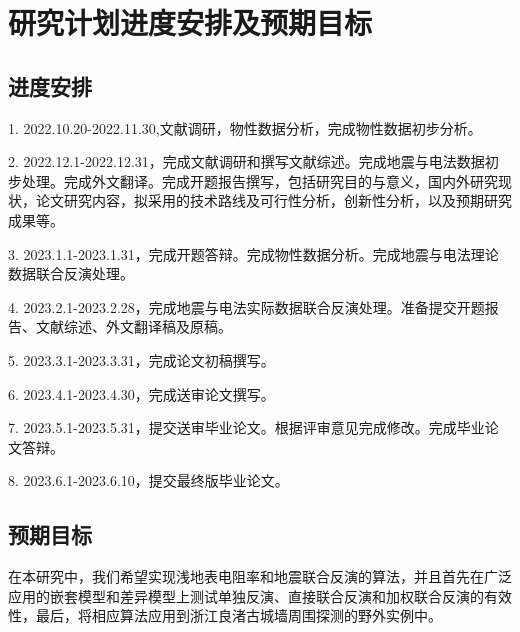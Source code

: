 \section{研究计划进度安排及预期目标}

\subsection{进度安排}

1. 2022.10.20-2022.11.30,文献调研，物性数据分析，完成物性数据初步分析。

2. 2022.12.1-2022.12.31，完成文献调研和撰写文献综述。完成地震与电法数据初步处理。完成外文翻译。完成开题报告撰写，包括研究目的与意义，国内外研究现状，论文研究内容，拟采用的技术路线及可行性分析，创新性分析，以及预期研究成果等。

3. 2023.1.1-2023.1.31，完成开题答辩。完成物性数据分析。完成地震与电法理论数据联合反演处理。

4. 2023.2.1-2023.2.28，完成地震与电法实际数据联合反演处理。准备提交开题报告、文献综述、外文翻译稿及原稿。

5. 2023.3.1-2023.3.31，完成论文初稿撰写。

6. 2023.4.1-2023.4.30，完成送审论文撰写。

7. 2023.5.1-2023.5.31，提交送审毕业论文。根据评审意见完成修改。完成毕业论文答辩。

8. 2023.6.1-2023.6.10，提交最终版毕业论文。

\subsection{预期目标}

在本研究中，我们希望实现浅地表电阻率和地震联合反演的算法，并且首先在广泛应用的嵌套模型和差异模型上测试单独反演、直接联合反演和加权联合反演的有效性，最后，将相应算法应用到浙江良渚古城墙周围探测的野外实例中。